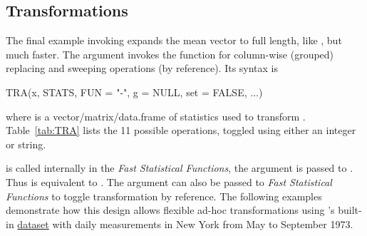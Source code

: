\documentclass[article]{jss}
\newcommand{\fct}[1]{\code{#1()}}
\begin{document}
\subsection{Transformations}
The final example invoking  expands the mean vector to full length, like , but much faster. The  argument invokes the \fct{TRA} function for column-wise (grouped) replacing and sweeping operations (by reference). Its syntax is
\begin{Code}
TRA(x, STATS, FUN = "-", g = NULL, set = FALSE, ...)
\end{Code}
where  is a vector/matrix/data.frame of statistics used to transform . Table~\ref{tab:TRA} lists the 11 possible  operations, toggled using either an integer or string.
%
\begin{table}[h!]
\caption{\label{tab:TRA} Available  choices in .}
\end{table}
%
 is called internally in the \emph{Fast Statistical Functions}, the  argument is passed to . Thus  is equivalent to . The  argument can also be passed to \emph{Fast Statistical Functions} to toggle transformation by reference. The following examples demonstrate how this design allows flexible ad-hoc transformations using 's built-in \href{https://www.rdocumentation.org/packages/datasets/versions/3.6.2/topics/airquality}{ dataset} with daily measurements in New York from May to September 1973.
\end{document}
